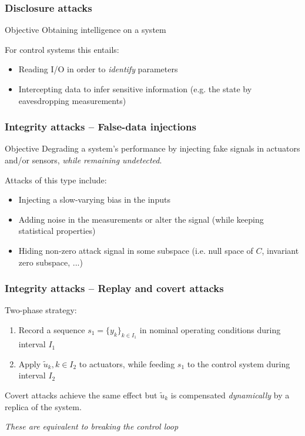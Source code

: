 \documentclass[presentation]{beamer}
\begin{document}
\begin{frame}
	\frametitle{Disclosure attacks}

	\begin{block}{Objective}
		\centering
		Obtaining intelligence on a system
	\end{block}

	\vspace{4ex}
	For control systems this entails:
	\begin{itemize}
		\item Reading I/O in order to \emph{identify} parameters
		\item Intercepting data to infer sensitive information (e.g. the state by eavesdropping measurements)
	\end{itemize}
\end{frame}

\begin{frame}
	\frametitle{Integrity attacks -- False-data injections}

	\begin{block}{Objective}
		\centering
		Degrading a system's performance by injecting fake signals in actuators and/or sensors, \emph{while remaining undetected}.
	\end{block}

	\vfill
	Attacks of this type include:
	\begin{itemize}
		\item Injecting a slow-varying bias in the inputs
		\item Adding noise in the measurements or alter the signal (while keeping statistical properties)
		\item Hiding non-zero attack signal in some subspace (i.e. null space of $C$, invariant zero subspace, ...)
	\end{itemize}
\end{frame}

\begin{frame}
	\frametitle{Integrity attacks -- Replay and covert attacks}

	Two-phase strategy:
	\begin{enumerate}
		\item Record a sequence $s_1 = \{y_k\}_{k \in I_1}$ in nominal operating conditions during interval $I_1$
		\item Apply $\tilde u_k, k \in I_2$ to actuators, while feeding $s_1$ to the control system during interval $I_2$ 
	\end{enumerate}
	
	\vfill
	Covert attacks achieve the same effect but $\tilde u_k$ is compensated \emph{dynamically} by a replica of the system.

	\vfill
	\emph{These are equivalent to breaking the control loop}
\end{frame}
\end{document}
